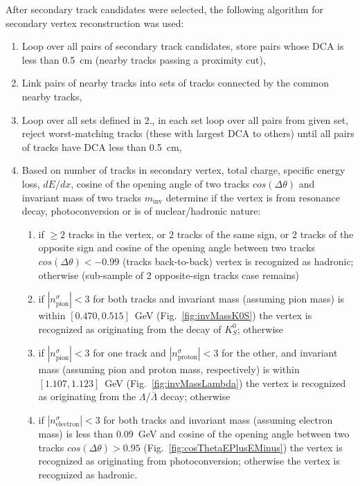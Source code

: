 After secondary track candidates were selected, the following algorithm for secondary vertex reconstruction was used:%
\vspace{-6pt}\begin{enumerate}
    \item Loop over all pairs of secondary track candidates, store pairs whose DCA is less than 0.5~cm (nearby tracks passing a proximity cut),\vspace{-6pt}
    \item Link pairs of nearby tracks into sets of tracks connected by the common nearby tracks,\vspace{-6pt}
    \item Loop over all sets defined in 2., in each set loop over all pairs from given set, reject worst-matching tracks (these with largest DCA to others) until all pairs of tracks have DCA less than 0.5~cm,\vspace{-6pt}
    \item Based on number of tracks in secondary vertex, total charge, specific energy loss, $dE/dx$, cosine of the opening angle of two tracks $cos(\Delta\theta)$ and invariant mass of two tracks $m_{\text{inv}}$ determine if the vertex is from resonance decay, photoconversion or is of nuclear/hadronic nature:\\[-16pt]
    \begin{enumerate}
    \item if $\geq2$ tracks in the vertex, or 2 tracks of the same sign, or 2 tracks of the opposite sign and cosine of the opening angle between two tracks $cos(\Delta\theta)<-0.99$ (tracks back-to-back) vertex is recognized as hadronic; otherwise (sub-sample of 2 opposite-sign tracks case remains)\\[-15pt]
    \item if $|n^{\sigma}_{\text{pion}}|<3$ for both tracks and invariant mass (assuming pion mass) is within $[0.470,0.515]$~GeV (Fig.~\ref{fig:invMassK0S}) the vertex is recognized as originating from the decay of $K^{0}_{S}$; otherwise\\[-15pt]
    \item if $|n^{\sigma}_{\text{pion}}|<3$ for one track and $|n^{\sigma}_{\text{proton}}|<3$ for the other, and invariant mass (assuming pion and proton mass, respectively) is within $[1.107,1.123]$~GeV (Fig.~\ref{fig:invMassLambda}) the vertex is recognized as originating from the $\Lambda$/$\bar{\Lambda}$ decay; otherwise\\[-15pt]
    \item if $|n^{\sigma}_{\text{electron}}|<3$ for both tracks and invariant mass (assuming electron mass) is less than $0.09$~GeV and cosine of the opening angle between two tracks $cos(\Delta\theta)>0.95$ (Fig.~\ref{fig:cosThetaEPlusEMinus}) the vertex is recognized as originating from photoconversion; otherwise the vertex is recognized as hadronic.
    \end{enumerate}%
\end{enumerate}%
